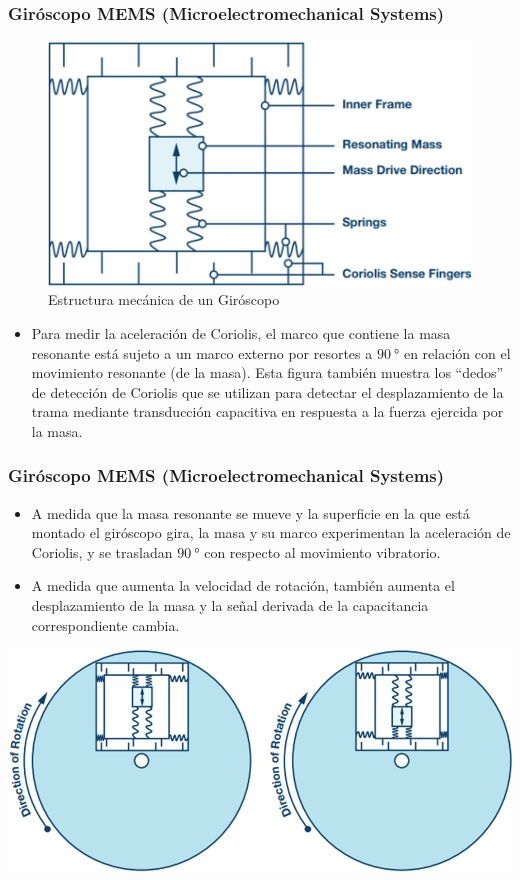 \begin{frame}
    \frametitle{Giróscopo MEMS (Microelectromechanical Systems)}
    \scriptsize

    \begin{figure}[!h]
        \centering
        \includegraphics[width=0.5\columnwidth]{images/gyroscope_mems_structure.png}
        \caption{Estructura mecánica de un Giróscopo}
    \end{figure}

    \begin{itemize}
        \item Para medir la aceleración de Coriolis, el marco que contiene la masa resonante está sujeto a un marco externo por resortes a $\SI{90}{\degree}$ en relación con el movimiento resonante (de la masa). Esta figura también muestra los ``dedos'' de detección de Coriolis que se utilizan para detectar el desplazamiento de la trama mediante transducción capacitiva en respuesta a la fuerza ejercida por la masa.
    \end{itemize}
\end{frame}

\begin{frame}
    \frametitle{Giróscopo MEMS (Microelectromechanical Systems)}
    
        
    \begin{itemize}
        \item A medida que la masa resonante se mueve y la superficie en la que está montado el giróscopo gira, la masa y su marco experimentan la aceleración de Coriolis, y se trasladan $\SI{90}{\degree}$ con respecto al movimiento vibratorio.
        
        \item A medida que aumenta la velocidad de rotación, también aumenta el desplazamiento de la masa y la señal derivada de la capacitancia correspondiente cambia.
    \end{itemize}
    
    \begin{center}
        \includegraphics[width=0.5\columnwidth]{images/gyroscope_mems_3.png}
    \end{center}

\end{frame}

